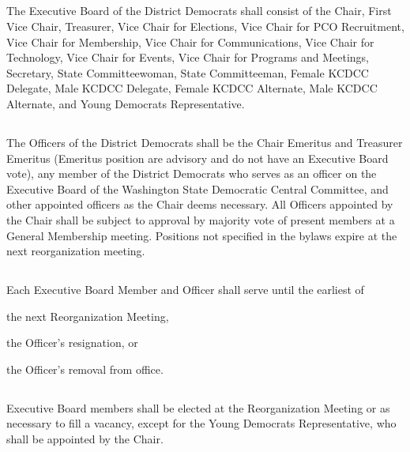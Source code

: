 \subsection{} \label{exec-board}
The Executive Board of the \fortythird{} District Democrats shall consist of the Chair, First Vice Chair, Treasurer, Vice Chair for Elections, Vice Chair for PCO Recruitment, Vice Chair for Membership, Vice Chair for Communications, Vice Chair for Technology, Vice Chair for Events, Vice Chair for Programs and Meetings, Secretary, State Committeewoman, State Committeeman, Female KCDCC Delegate, Male KCDCC Delegate, Female KCDCC Alternate, Male KCDCC Alternate, and Young Democrats Representative.

\subsection{} \label{officers}
The Officers of the \fortythird{} District Democrats shall be the Chair Emeritus and Treasurer Emeritus (Emeritus position are advisory and do not have an Executive Board vote), any member of the \fortythird{} District Democrats who serves as an officer on the Executive Board of the Washington State Democratic Central Committee, and other appointed officers as the Chair deems necessary. All Officers appointed by the Chair shall be subject to approval by majority vote of present members at a General Membership meeting. Positions not specified in the bylaws expire at the next reorganization meeting.

\subsection{}
Each Executive Board Member and Officer shall serve until the earliest of
\begin{inlinealphalist}
    \item the next Reorganization Meeting,
    \item the Officer’s resignation, or
    \item the Officer’s removal from office.
\end{inlinealphalist}

\subsection{}
Executive Board members shall be elected at the Reorganization Meeting or as necessary to fill a vacancy, except for the Young Democrats Representative, who shall be appointed by the Chair.

